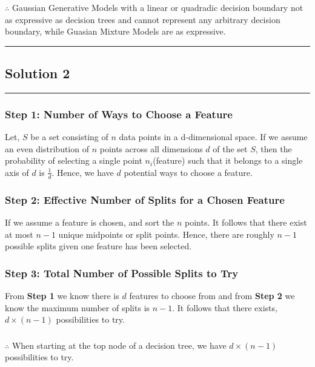 \documentclass{article}
\begin{document}
\subsubsection*{\normalfont}{$\therefore$ Gaussian Generative Models with a linear or quadradic decision boundary not as expressive as decision trees and cannot represent any arbitrary decision boundary, while Guasian Mixture Models are as expressive.}


\noindent\rule{\textwidth}{0.4pt}

\newpage

\subsection*{Solution 2}
\noindent\rule{\textwidth}{0.4pt}

\subsubsection*{Step 1: Number of Ways to Choose a Feature}
\parbox{\textwidth}{
  Let, $S$ be a set consisting of $n$ data points in a d-dimensional space. 
  If we assume an even distribution of $n$ points across all dimensions $d$ of the set $S$, then the probability of selecting a single point $n_i$(feature) such that it belongs to a single axis of $d$ is $\frac{1}{d}$.
  Hence, we have $d$ potential ways to choose a feature.
}

\subsubsection*{Step 2: Effective Number of Splits for a Chosen Feature}
\parbox{\textwidth}{
If we assume a feature is chosen, and sort the $n$ points. It follows that there exist at most $n-1$ unique midpoints or split points. 
Hence, there are roughly $n-1$ possible splits given one feature has been selected.
}

\subsubsection*{Step 3: Total Number of Possible Splits to Try}
\parbox{\textwidth}{
  From \textbf{Step 1} we know there is $d$ features to choose from and from \textbf{Step 2} we know the maximum number of splits is $n-1$.
  It follows that there exists, $d \times (n-1)$ possibilities to try.
}

\subsubsection*{\normalfont}{$\therefore$ When starting at the top node of a decision tree, we have $d \times (n-1)$ possibilities to try.}
\end{document}
